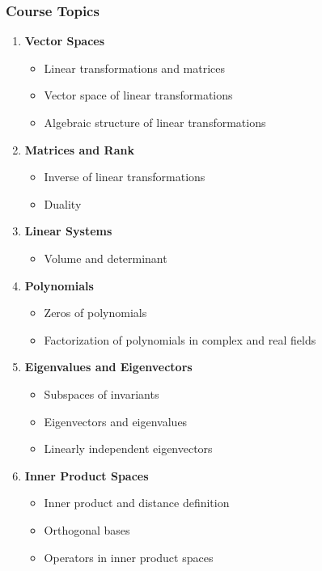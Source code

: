\documentclass[12pt]{article}
\begin{document}
\subsubsection*{Course Topics}
\begin{enumerate}
    \item \textbf{Vector Spaces}
        \begin{itemize}
            \item Linear transformations and matrices
            \item Vector space of linear transformations
            \item Algebraic structure of linear transformations
        \end{itemize}
    
    \item \textbf{Matrices and Rank}
        \begin{itemize}
            \item Inverse of linear transformations
            \item Duality
        \end{itemize}
    
    \item \textbf{Linear Systems}
        \begin{itemize}
            \item Volume and determinant
        \end{itemize}
    
    \item \textbf{Polynomials}
        \begin{itemize}
            \item Zeros of polynomials
            \item Factorization of polynomials in complex and real fields
        \end{itemize}
    
    \item \textbf{Eigenvalues and Eigenvectors}
        \begin{itemize}
            \item Subspaces of invariants
            \item Eigenvectors and eigenvalues
            \item Linearly independent eigenvectors
        \end{itemize}
    
    \item \textbf{Inner Product Spaces}
        \begin{itemize}
            \item Inner product and distance definition
            \item Orthogonal bases
            \item Operators in inner product spaces
        \end{itemize}
    

\end{enumerate}
\end{document}
